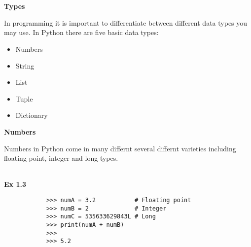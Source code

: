 \documentclass[letterpaper,11pt]{article}
\begin{document}
\\ \\
\textbf{Types}
\par{In programming it is important to differentiate between different data
types you may use. In Python there are five basic data types: }
\begin{itemize}
    \item Numbers
    \item String
    \item List
    \item Tuple
    \item Dictionary
\end{itemize}
\textbf{Numbers}
\par{Numbers in Python come in many differnt several differnt varieties
including floating point, integer and long types.}
\\ \\
\begin{minipage}{.5\textwidth}
    \small \textbf{Ex 1.3}
    \begin{tcolorbox}
        \begin{footnotesize}
            \begin{verbatim}
            >>> numA = 3.2           # Floating point
            >>> numB = 2             # Integer
            >>> numC = 535633629843L # Long
            >>> print(numA + numB)
            >>> 
            >>> 5.2
            \end{verbatim}
        \end{footnotesize}
    \end{tcolorbox}
\end{minipage}
\end{document}
